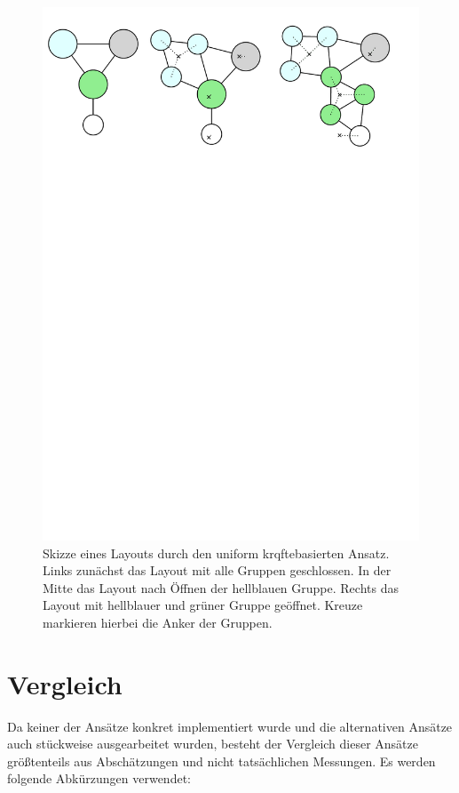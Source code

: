 \begin{figure}[h!]
\begin{center}
	\includegraphics[width=\textwidth]{Pics/uniform_kb.pdf}
	\caption{Skizze eines Layouts durch den uniform krqftebasierten Ansatz. Links zunächst das Layout mit alle Gruppen geschlossen. In der Mitte das Layout nach Öffnen der hellblauen Gruppe. Rechts das Layout mit hellblauer und grüner Gruppe geöffnet. Kreuze markieren hierbei die Anker der Gruppen.}
	\label{UniformK-Skizze}
\end{center}
\end{figure}


\section{Vergleich}
Da keiner der Ansätze konkret implementiert wurde und die alternativen Ansätze auch stückweise ausgearbeitet wurden, besteht der Vergleich dieser Ansätze größtenteils aus Abschätzungen und nicht tatsächlichen Messungen. Es werden folgende Abkürzungen verwendet:

